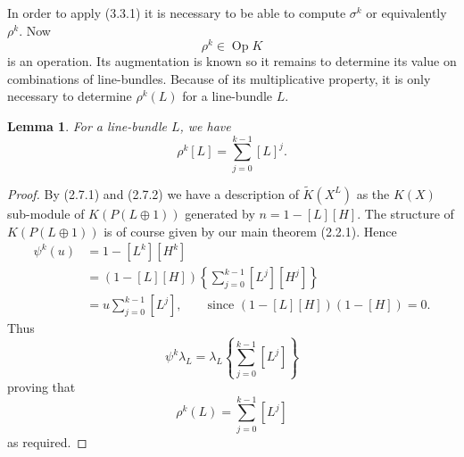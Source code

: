 \documentclass[leqno]{book}
\numberwithin{equation}{section}
\newtheorem{lemma}[theorem]{Lemma}
\theoremstyle{definition}
\begin{document}
            In order to apply (3.3.1) it is necessary to be able to compute $\sigma^{k}$ or equivalently $\rho^{k}$. Now
            \begin{equation*}
              \rho^{k} \in \operatorname{Op} K
            \end{equation*}
            is an operation. Its augmentation is known so it remains to determine its value on combinations of line-bundles. Because of its multiplicative property, it is only necessary to determine $\rho^{k}(L)$ for a line-bundle $L$.

            \begin{lemma}
              For a line-bundle $L$, we have 
              \begin{equation*}
                \rho^{k}[L]=\sum_{j=0}^{k-1}[L]^{j}.
              \end{equation*}
            \end{lemma}

            \begin{proof}
              By (2.7.1) and (2.7.2) we have a description of $\tilde{K}(X^{L})$ as the $K(X)$ sub-module of $K(P(L\oplus 1))$ generated by $n=1-[L][H]$. The structure of $K(P(L\oplus 1))$ is of course given by our main theorem (2.2.1). Hence
              \begin{equation*}
                \begin{aligned}
                \psi^{k}(u) &= 1-[L^{k}][H^{k}] \\
                &= (1-[L][H])\left\{\sum_{j=0}^{k-1}[L^{j}][H^{j}]\right\} \\
                &= u \sum_{j=0}^{k-1}[L^{j}], \qquad \text{since } (1-[L][H])(1-[H])=0.
                \end{aligned}
              \end{equation*}
              Thus
              \begin{equation*}
                \psi^{k}\lambda_{L}=\lambda_{L}\left\{\sum_{j=0}^{k-1}[L^{j}]\right\}
              \end{equation*}
              proving that 
              \begin{equation*}
                \rho^{k}(L)=\sum_{j=0}^{k-1}[L^{j}]
              \end{equation*}
              as required.
            \end{proof}
\end{document}
